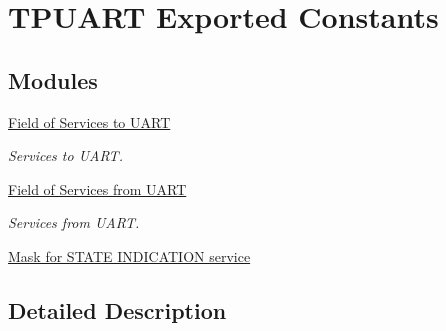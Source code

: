 \hypertarget{group___k_n_x___p_h___t_p_uart___exported___constants}{}\section{T\+P\+U\+A\+RT Exported Constants}
\label{group___k_n_x___p_h___t_p_uart___exported___constants}
\subsection*{Modules}
\begin{DoxyCompactItemize}
\item 
\hyperlink{group___u_a_r_t___control___to}{Field of Services to U\+A\+RT}
\begin{DoxyCompactList}\small\item\em Services to U\+A\+RT. \end{DoxyCompactList}\item 
\hyperlink{group___u_a_r_t___control___from}{Field of Services from U\+A\+RT}
\begin{DoxyCompactList}\small\item\em Services from U\+A\+RT. \end{DoxyCompactList}\item 
\hyperlink{group___u_a_r_t___control___mask}{Mask for S\+T\+A\+T\+E I\+N\+D\+I\+C\+A\+T\+I\+O\+N service}
\end{DoxyCompactItemize}


\subsection{Detailed Description}
